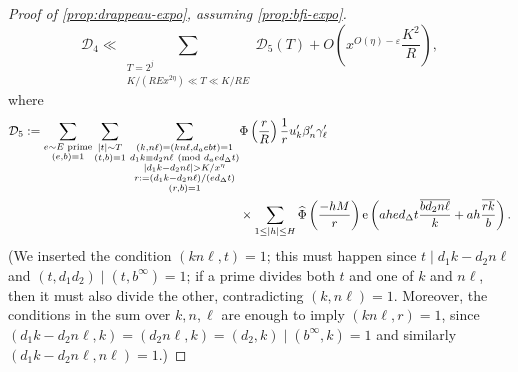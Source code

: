 \documentclass[reqno,11pt]{amsart}
\theoremstyle{definition}
\theoremstyle{remark}
\numberwithin{equation}{section}
\newcommand{\mD}{\mathcal{D}}
\newcommand{\e}{\textnormal{e}}
\newcommand{\eps}{\varepsilon}
\renewcommand{\bar}{\overline}
\renewcommand{\hat}{\widehat}
\renewcommand{\pmod}[1]{\ (\textnormal{mod } #1)}
\begin{document}
\begin{proof}[Proof of \cref{prop:drappeau-expo}, assuming \cref{prop:bfi-expo}]
\begin{equation}
    \mD_4 \ll \sum_{\substack{T = 2^j \\ K/(RE x^{2\eta}) \ll T \ll K/RE}} \mD_5(T)
    +
    O\left(x^{O(\eta) - \eps} \frac{K^2}{R}\right),
\end{equation}
where
\[
\begin{aligned}
    \mD_5 := \sum_{\substack{e \sim E \text{ prime} \\ (e, b) = 1}}
    \sum_{\substack{|t| \sim T \\ (t, b) = 1}}\,
    \sum_{\substack{(k, n\ell) = (k n \ell, d_aebt) = 1 \\ d_1k \equiv d_2n \ell \pmod{d_aed_\Delta t} \\ |d_1k - d_2n \ell| > K/x^\eta \\ r := (d_1 k - d_2 n \ell)/(ed_\Delta t) \\ (r, b) = 1}} 
    &\Phi\left(\frac{r}{R}\right) \frac{1}{r} 
    u'_k \beta'_n \gamma'_\ell 
    \\
    &\times \sum_{1 \le |h| \le H} \hat{\Phi}\left(\frac{-hM}{r}\right) \e\left(ahe d_\Delta t \frac{\bar{b d_2n \ell}}{k} + ah\frac{\bar{rk}}{b} \right).
\end{aligned}
\]
(We inserted the condition $(kn\ell, t) = 1$; this must happen since $t \mid d_1 k - d_2 n \ell$ and $(t, d_1 d_2) \mid (t, b^\infty) = 1$; if a prime divides both $t$ and one of $k$ and $n\ell$, then it must also divide the other, contradicting $(k, n\ell) = 1$. Moreover, the conditions in the sum over $k, n, \ell$ are enough to imply $(kn\ell, r) = 1$, since $(d_1 k - d_2 n\ell, k) = (d_2 n\ell, k) = (d_2, k) \mid (b^\infty, k) = 1$ and similarly $(d_1 k- d_2 n\ell, n\ell) = 1$.)


\end{proof}
\end{document}

